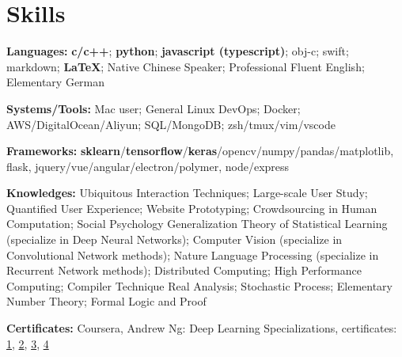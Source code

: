\section{\textbf{Skills}}
\resumeSubHeadingListStart
\item{
  \textbf{Languages:}{ \textbf{c/c++}; \textbf{python}; \textbf{javascript (typescript)}; obj-c; swift; markdown; \textbf{\LaTeX}; Native Chinese Speaker; Professional Fluent English; Elementary German}
}
\item{
 \textbf{Systems/Tools:}{ Mac user; General Linux DevOps; Docker; AWS/DigitalOcean/Aliyun; SQL/MongoDB; zsh/tmux/vim/vscode}
}
\item{
 \textbf{Frameworks:}{ \textbf{sklearn}/\textbf{tensorflow}/\textbf{keras}/opencv/numpy/pandas/matplotlib, flask, jquery/vue/angular/electron/polymer, node/express}
}
\item{
  \textbf{Knowledges:}{ 
    \resumeItemListStart
       { Ubiquitous Interaction Techniques; Large-scale User Study; Quantified User Experience; Website Prototyping; Crowdsourcing in Human Computation; Social Psychology}
       { Generalization Theory of Statistical Learning (specialize in Deep Neural Networks); Computer Vision (specialize in Convolutional Network methods); Nature Language Processing (specialize in Recurrent Network methods); Distributed Computing; High Performance Computing; Compiler Technique}
       { Real Analysis; Stochastic Process; Elementary Number Theory; Formal Logic and Proof}
   \resumeItemListEnd
  }
}
\item{
 \textbf{Certificates:}{
  Coursera, Andrew Ng: Deep Learning Specializations, certificates:
  \href{https://www.coursera.org/account/accomplishments/verify/YH4NT7HHN263}{1}, 
  \href{https://www.coursera.org/account/accomplishments/verify/QGH3GNGF6BM4}{2}, 
  \href{https://www.coursera.org/account/accomplishments/verify/6VU45R2SZEF6}{3},
  \href{https://www.coursera.org/account/accomplishments/verify/LF3K9BQQDLVL}{4}
 }
}
\resumeSubHeadingListEnd